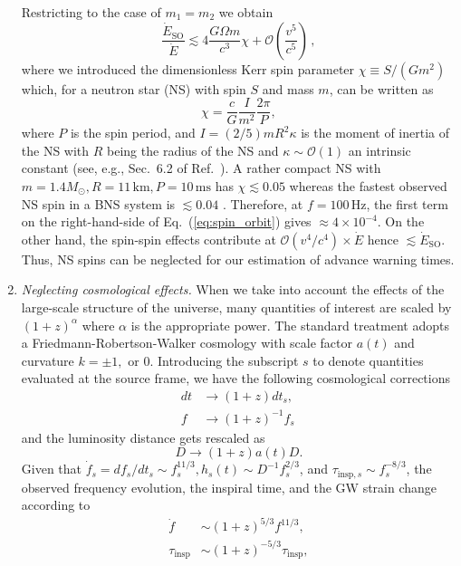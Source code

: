 \documentclass[prd,amsmath,amssymb,aps,floats,amsfonts,notitlepage,superscriptaddress,eqsecnum,nofootinbib,10pt]{revtex4-1}
\newcommand{\ord}{\mathcal{O}}
\newcommand{\f}{\frac}
\newcommand{\be}{\begin{equation}}
\newcommand{\ee}{\end{equation}}
\begin{document}
\begin{enumerate}
Restricting to the case of $m_1=m_2$ we obtain
%
\be
\f{\dot{E}_{\text{SO}}}{\dot{E}} \lesssim 4 \f{G\Omega m}{c^3}\chi + \ord\left(\f{v^5}{c^5}\right) \label{eq:spin_orbit}\, ,
\ee
%
where we introduced the dimensionless Kerr spin parameter $\chi\equiv {S}/({G m^2})$ which, for a neutron star (NS) with spin $S$ and mass $m$, can be written as
%
\be
\chi=\f{c}{G} \f{I}{m^2} \f{2\pi}{P},  \label{eq:NS_spin}
\ee
%
where $P$ is the spin period, and $ I = (2/5) m R^2 \kappa$ is the moment of inertia of the NS with $R$ being the radius of the NS and $\kappa \sim \ord(1)$ an intrinsic constant (see, e.g., Sec.~6.2 of Ref.~\cite{Colpi_Sesana}). 
A rather compact NS with $m=1.4 M_\odot, R=11\,\text{km}, P= 10\,\text{ms}$ has $\chi\lesssim 0.05$ whereas
the fastest observed NS spin in a BNS system is $\lesssim 0.04$ \cite{0264-9381-26-7-073001}.
Therefore, at $f= 100\,$Hz, the first term on the right-hand-side of Eq.~(\ref{eq:spin_orbit}) gives $\approx 4\times 10^{-4}$. 
On the other hand, the spin-spin effects contribute at $\ord(v^4/c^4)\times\dot{E}$ hence $\lesssim \dot{E}_\text{SO}$.
Thus, NS spins can be neglected for our estimation of advance warning times. %
%
\item {\it Neglecting cosmological effects.}
When we take into account the effects of the large-scale structure of the universe, many quantities of interest are scaled by $(1+z)^\alpha$ where $\alpha$
is the appropriate power. The standard treatment adopts a Friedmann-Robertson-Walker cosmology with scale factor $a(t)$ and curvature $k=\pm 1, \text{ or } 0$.
Introducing the subscript $s$ to denote quantities evaluated at the source frame, we have the following cosmological corrections
%
\begin{align}
dt& \rightarrow (1+z) dt_s, \\
 f & \rightarrow (1+z)^{-1} f_s\, 
\end{align}
and the luminosity distance gets rescaled as
\be
D  \rightarrow  (1+z)a(t) D.
\ee
%
Given that $\dot{f}_s=df_s/dt_s\sim f^{11/3}_s, h_s(t)\sim D^{-1} f_s^{2/3}$, and $\tau_{\text{insp},s}\sim f_s^{-8/3}$,
the observed frequency evolution, the inspiral time, 
and the GW strain change according to %
\begin{align}
\dot{f}\ \ &\sim (1+z)^{5/3}{f}^{11/3},\\
\tau_\text{insp}& \sim (1+z)^{-5/3} \tau_{\text{insp}},\\

\end{align}
\end{enumerate}
\end{document}
